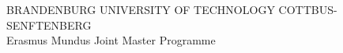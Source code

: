 




















\thispagestyle{empty}

\hfill

\begin{center}

{\large BRANDENBURG UNIVERSITY OF TECHNOLOGY COTTBUS-SENFTENBERG} \\
{Erasmus Mundus Joint Master Programme}\\

\bigskip
\end{center}


\medskip

